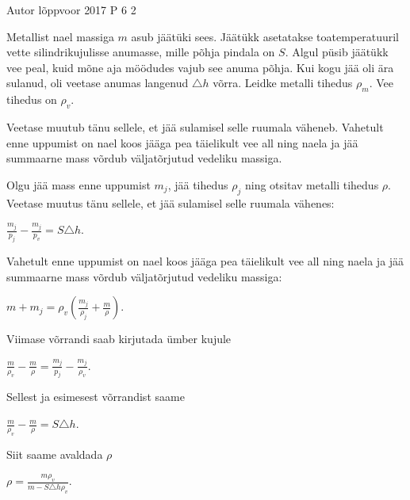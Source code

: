{Autor} %
{lõppvoor} %
{2017} %
{P 6} %
{2} %
{

\ifStatement
Metallist nael massiga $m$ asub jäätüki sees. Jäätükk asetatakse toatemperatuuril vette silindrikujulisse anumasse, mille põhja pindala on $S$. Algul püsib jäätükk vee peal, kuid mõne aja möödudes vajub see anuma põhja. Kui kogu jää oli ära sulanud, oli veetase anumas langenud $\triangle h$ võrra. Leidke metalli tihedus $\rho _m$. Vee tihedus on $\rho_v$.
\fi

\ifHint
Veetase muutub tänu sellele, et jää sulamisel selle ruumala väheneb. Vahetult enne uppumist on nael koos jääga pea täielikult vee all ning naela ja jää summaarne mass võrdub väljatõrjutud vedeliku massiga.
\fi

\ifSolution
Olgu jää mass enne uppumist $m_j$, jää tihedus $\rho_j$ ning otsitav metalli tihedus $\rho$.
Veetase muutus tänu sellele, et jää sulamisel selle ruumala vähenes:
\begin{center}
$\frac{m_j}{p_j} - \frac{m_j}{p_v} = S\triangle h$.
\end{center}
Vahetult enne uppumist on nael koos jääga pea täielikult vee all ning naela ja jää summaarne mass võrdub väljatõrjutud vedeliku massiga:
\begin{center}
$m + m_j = \rho_v (\frac{m_j}{\rho_j} + \frac{m}{\rho})$.
\end{center}
Viimase võrrandi saab kirjutada ümber kujule
\begin{center}
$\frac{m}{\rho_v} - \frac{m}{\rho} = \frac{m_j}{p_j} - \frac{m_j}{\rho_v}$.
\end{center}
Sellest ja esimesest võrrandist saame
\begin{center}
$\frac{m}{\rho_v} - \frac{m}{\rho} = S \triangle h$.
\end{center}
Siit saame avaldada $\rho$
\begin{center}
$\rho = \frac{m \rho_v}{m - S \triangle h \rho_v}$.
\end{center}
\fi
}